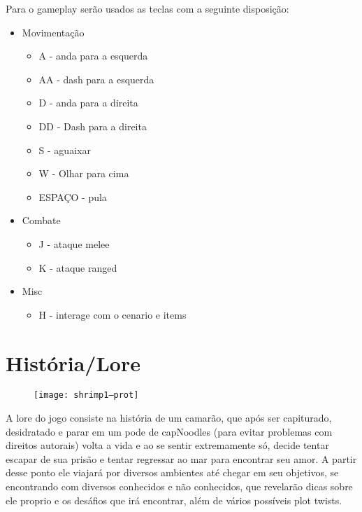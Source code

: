     Para o gameplay serão usados as teclas com a seguinte disposição:
    \begin{itemize}
        \item Movimentação
        \begin{itemize}
            \item A  - anda para a esquerda
            \item AA - dash para a esquerda
            \item D  - anda para a direita
            \item DD - Dash para a direita
            \item S  - aguaixar
            \item W  - Olhar para cima
            \item ESPAÇO - pula
        \end{itemize}
 
        \item Combate
        \begin{itemize}
            \item J - ataque melee
            \item K - ataque ranged
        \end{itemize}

        \item Misc
        \begin{itemize}
            \item H - interage com o cenario e items
        \end{itemize}

    \end{itemize}
    
\section{História/Lore}%
    \begin{figure}[H]
        \texttt{[image: shrimp1--prot]}
    \centering
    \end{figure}


    A lore do jogo consiste na história de um camarão, que após ser capiturado, desidratado e parar em um pode de capNoodles (para evitar problemas com direitos autorais) volta a vida e ao se sentir extremamente só, decide tentar escapar de sua prisão e tentar regressar ao mar para encontrar seu amor. A partir desse ponto ele viajará por diversos ambientes até chegar em seu objetivos, se encontrando com diversos conhecidos e não conhecidos, que revelarão dicas sobre ele proprio e os desáfios que irá encontrar, além de vários possíveis plot twists.

